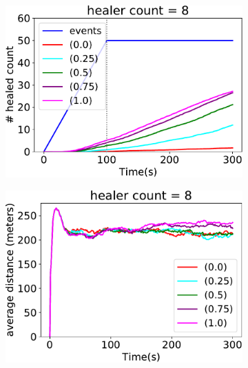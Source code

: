 \begin{figure}
\begin{subfigure}[b]{0.32\textwidth}
\end{subfigure}
\par\bigskip %
\centering
\begin{subfigure}[b]{0.32\textwidth}
\centering
\includegraphics[width=\textwidth]{papers/mdpi2020/imgs/healed-8.pdf}
\end{subfigure}
\hfill
%
\begin{subfigure}[b]{0.32\textwidth}
\centering
\includegraphics[width=\textwidth]{papers/mdpi2020/imgs/avg-distance-from-leader-8.pdf}
\end{subfigure}
\hfill
%
\begin{subfigure}[b]{0.32\textwidth}
\centering

\end{subfigure}
\end{figure}

